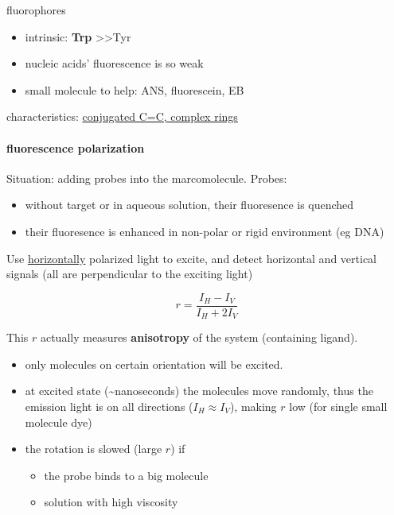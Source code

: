 \documentclass[]{article}
\let\oldparagraph\paragraph
\renewcommand{\paragraph}[1]{\oldparagraph{#1}\mbox{}}
\begin{document}
fluorophores

\begin{itemize}
\item
  intrinsic: \textbf{Trp} \textgreater{}\textgreater{}Tyr
\item
  nucleic acids' fluorescence is so weak
\item
  small molecule to help: ANS, fluorescein, EB
\end{itemize}

characteristics: \underline{conjugated C=C, complex rings}

\hypertarget{fluorescence-polarization}{%
\paragraph{fluorescence polarization}\label{fluorescence-polarization}}

Situation: adding probes into the marcomolecule. Probes:

\begin{itemize}
\item
  without target or in aqueous solution, their fluoresence is quenched
\item
  their fluoresence is enhanced in non-polar or rigid environment (eg
  DNA)
\end{itemize}

Use \underline{horizontally} polarized light to excite, and detect
horizontal and vertical signals (all are perpendicular to the exciting
light)

\[r=\dfrac{I_H-I_V}{I_H+2I_V}\]

This \(r\) actually measures \textbf{anisotropy} of the system
(containing ligand).

\begin{itemize}
\item
  only molecules on certain orientation will be excited.
\item
  at excited state (\textasciitilde{}nanoseconds) the molecules move
  randomly, thus the emission light is on all directions
  (\(I_H\approx I_V\)), making \(r\) low (for single small molecule dye)
\item
  the rotation is slowed (large \(r\)) if

  \begin{itemize}
  \item
    the probe binds to a big molecule
  \item
    solution with high viscosity
  \end{itemize}
\end{itemize}
\end{document}
